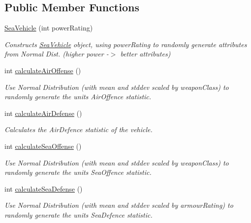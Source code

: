 \subsection*{Public Member Functions}
\begin{DoxyCompactItemize}
\item 
\mbox{\hyperlink{class_sea_vehicle_a9e0bd06195fbb91413c97a8572ed9345}{Sea\+Vehicle}} (int power\+Rating)
\begin{DoxyCompactList}\small\item\em Constructs \mbox{\hyperlink{class_sea_vehicle}{Sea\+Vehicle}} object, using power\+Rating to randomly generate attributes from Normal Dist. (higher power -\/$>$ better attributes) \end{DoxyCompactList}\item 
int \mbox{\hyperlink{class_sea_vehicle_a24b41898db73af6d04ae91ddcf97f4a4}{calculate\+Air\+Offense}} ()
\begin{DoxyCompactList}\small\item\em Use Normal Distribution (with mean and stddev scaled by weapon\+Class) to randomly generate the unit\textquotesingle{}s Air\+Offence statistic. \end{DoxyCompactList}\item 
int \mbox{\hyperlink{class_sea_vehicle_a694afec180b77cee3adf29674e0c3160}{calculate\+Air\+Defense}} ()
\begin{DoxyCompactList}\small\item\em Calculates the Air\+Defence statistic of the vehicle. \end{DoxyCompactList}\item 
int \mbox{\hyperlink{class_sea_vehicle_a0b7105037f612389b5af8471801ecee0}{calculate\+Sea\+Offense}} ()
\begin{DoxyCompactList}\small\item\em Use Normal Distribution (with mean and stddev scaled by weapon\+Class) to randomly generate the unit\textquotesingle{}s Sea\+Offence statistic. \end{DoxyCompactList}\item 
int \mbox{\hyperlink{class_sea_vehicle_aeca10ceffca2683364af15e67e666281}{calculate\+Sea\+Defense}} ()
\begin{DoxyCompactList}\small\item\em Use Normal Distribution (with mean and stddev scaled by armour\+Rating) to randomly generate the unit\textquotesingle{}s Sea\+Defence statistic. \end{DoxyCompactList}\item 

\end{DoxyCompactItemize}
